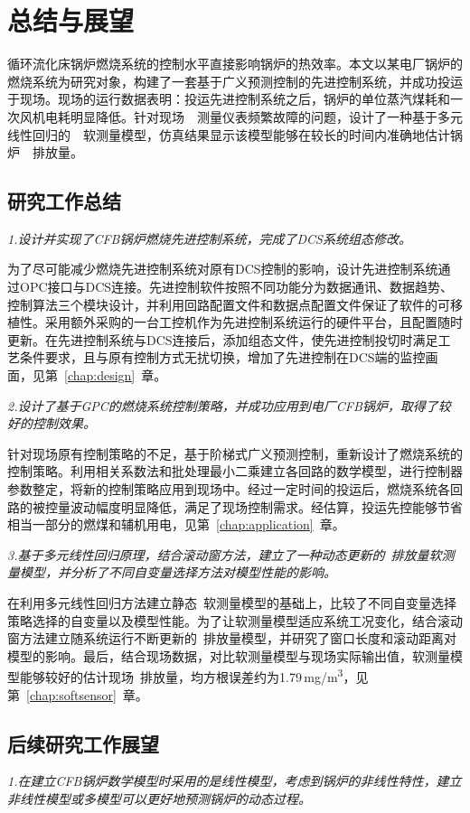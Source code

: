\chapter{总结与展望}

循环流化床锅炉燃烧系统的控制水平直接影响锅炉的热效率。本文以某电厂锅炉的燃烧系统为研究对象，构建了一套基于广义预测控制的先进控制系统，并成功投运于现场。现场的运行数据表明：投运先进控制系统之后，锅炉的单位蒸汽煤耗和一次风机电耗明显降低。针对现场~~测量仪表频繁故障的问题，设计了一种基于多元线性回归的~~软测量模型，仿真结果显示该模型能够在较长的时间内准确地估计锅炉~~排放量。

\section{研究工作总结}
\emph{1.设计并实现了CFB锅炉燃烧先进控制系统，完成了DCS系统组态修改。}

为了尽可能减少燃烧先进控制系统对原有DCS控制的影响，设计先进控制系统通过OPC接口与DCS连接。先进控制软件按照不同功能分为数据通讯、数据趋势、控制算法三个模块设计，并利用回路配置文件和数据点配置文件保证了软件的可移植性。采用额外采购的一台工控机作为先进控制系统运行的硬件平台，且配置随时更新。在先进控制系统与DCS连接后，添加组态文件，使先进控制投切时满足工艺条件要求，且与原有控制方式无扰切换，增加了先进控制在DCS端的监控画面，见第~\ref{chap:design}~章。

\emph{2.设计了基于GPC的燃烧系统控制策略，并成功应用到电厂CFB锅炉，取得了较好的控制效果。}

针对现场原有控制策略的不足，基于阶梯式广义预测控制，重新设计了燃烧系统的控制策略。利用相关系数法和批处理最小二乘建立各回路的数学模型，进行控制器参数整定，将新的控制策略应用到现场中。经过一定时间的投运后，燃烧系统各回路的被控量波动幅度明显降低，满足了现场控制需求。经估算，投运先控能够节省相当一部分的燃煤和辅机用电，见第~\ref{chap:application}~章。

\emph{3.基于多元线性回归原理，结合滚动窗方法，建立了一种动态更新的~排放量软测量模型，并分析了不同自变量选择方法对模型性能的影响。}

在利用多元线性回归方法建立静态~软测量模型的基础上，比较了不同自变量选择策略选择的自变量以及模型性能。为了让软测量模型适应系统工况变化，结合滚动窗方法建立随系统运行不断更新的~排放量模型，并研究了窗口长度和滚动距离对模型的影响。最后，结合现场数据，对比软测量模型与现场实际输出值，软测量模型能够较好的估计现场~排放量，均方根误差约为1.79$\,$\si{mg/m^3}，见第~\ref{chap:softsensor}~章。


\section{后续研究工作展望}
\emph{1.在建立CFB锅炉数学模型时采用的是线性模型，考虑到锅炉的非线性特性，建立非线性模型或多模型可以更好地预测锅炉的动态过程。}

